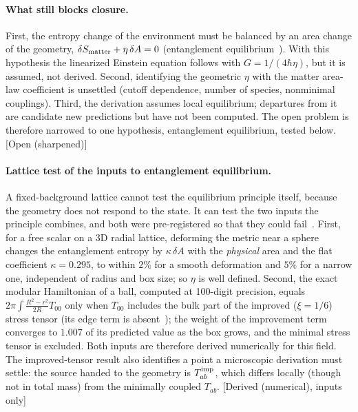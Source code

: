 \documentclass[11pt]{article}
\newcommand{\st}[1]{\textsf{\small[#1]}}
\theoremstyle{plain}
\theoremstyle{definition}
\theoremstyle{remark}
\begin{document}
\paragraph{What still blocks closure.}
First, the entropy change of the environment must be balanced by an area change of the geometry, $\delta S_{\rm matter}+\eta\,\delta A=0$ (entanglement equilibrium~\cite{Jacobson2016}). With this hypothesis the linearized Einstein equation follows with $G=1/(4\hbar\eta)$, but it is assumed, not derived. Second, identifying the geometric $\eta$ with the matter area-law coefficient is unsettled (cutoff dependence, number of species, nonminimal couplings). Third, the derivation assumes local equilibrium; departures from it are candidate new predictions but have not been computed. The open problem is therefore narrowed to one hypothesis, entanglement equilibrium, tested below. \st{Open (sharpened)}

\paragraph{Lattice test of the inputs to entanglement equilibrium.}
A fixed-background lattice cannot test the equilibrium principle itself, because the geometry does not respond to the state. It can test the two inputs the principle combines, and both were pre-registered so that they could fail~\cite{JordanNote4}. First, for a free scalar on a 3D radial lattice, deforming the metric near a sphere changes the entanglement entropy by $\kappa\,\delta A$ with the \emph{physical} area and the flat coefficient $\kappa=0.295$, to within $2\%$ for a smooth deformation and $5\%$ for a narrow one, independent of radius and box size; so $\eta$ is well defined. Second, the exact modular Hamiltonian of a ball, computed at 100-digit precision, equals $2\pi\int\frac{R^2-r^2}{2R}T_{00}$ only when $T_{00}$ includes the bulk part of the improved ($\xi=1/6$) stress tensor (its edge term is absent~\cite{JordanNote5}); the weight of the improvement term converges to $1.007$ of its predicted value as the box grows, and the minimal stress tensor is excluded. Both inputs are therefore derived numerically for this field. The improved-tensor result also identifies a point a microscopic derivation must settle: the source handed to the geometry is $T^{\rm imp}_{ab}$, which differs locally (though not in total mass) from the minimally coupled $T_{ab}$. \st{Derived (numerical), inputs only}
\end{document}
